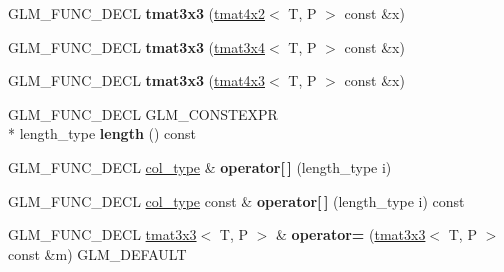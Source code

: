 \begin{DoxyCompactItemize}
\item 
\hypertarget{structglm_1_1tmat3x3_ae8cd7af88bb36bd318cf96f86bc27725}{G\-L\-M\-\_\-\-F\-U\-N\-C\-\_\-\-D\-E\-C\-L {\bfseries tmat3x3} (\hyperlink{structglm_1_1tmat4x2}{tmat4x2}$<$ T, P $>$ const \&x)}\label{structglm_1_1tmat3x3_ae8cd7af88bb36bd318cf96f86bc27725}

\item 
\hypertarget{structglm_1_1tmat3x3_a1498a92906adaa18834058fbea37a808}{G\-L\-M\-\_\-\-F\-U\-N\-C\-\_\-\-D\-E\-C\-L {\bfseries tmat3x3} (\hyperlink{structglm_1_1tmat3x4}{tmat3x4}$<$ T, P $>$ const \&x)}\label{structglm_1_1tmat3x3_a1498a92906adaa18834058fbea37a808}

\item 
\hypertarget{structglm_1_1tmat3x3_aca274ab9905b48dac255a6ae295dc193}{G\-L\-M\-\_\-\-F\-U\-N\-C\-\_\-\-D\-E\-C\-L {\bfseries tmat3x3} (\hyperlink{structglm_1_1tmat4x3}{tmat4x3}$<$ T, P $>$ const \&x)}\label{structglm_1_1tmat3x3_aca274ab9905b48dac255a6ae295dc193}

\item 
\hypertarget{structglm_1_1tmat3x3_afa107e9f2a195193a8d3843465956cdd}{G\-L\-M\-\_\-\-F\-U\-N\-C\-\_\-\-D\-E\-C\-L G\-L\-M\-\_\-\-C\-O\-N\-S\-T\-E\-X\-P\-R \\*
length\-\_\-type {\bfseries length} () const }\label{structglm_1_1tmat3x3_afa107e9f2a195193a8d3843465956cdd}

\item 
\hypertarget{structglm_1_1tmat3x3_a168abb413d19f4ff78005b4a4015c9e1}{G\-L\-M\-\_\-\-F\-U\-N\-C\-\_\-\-D\-E\-C\-L \hyperlink{structglm_1_1tvec3}{col\-\_\-type} \& {\bfseries operator\mbox{[}$\,$\mbox{]}} (length\-\_\-type i)}\label{structglm_1_1tmat3x3_a168abb413d19f4ff78005b4a4015c9e1}

\item 
\hypertarget{structglm_1_1tmat3x3_a7098a8e6c89fb4bce4a95e15b477a93e}{G\-L\-M\-\_\-\-F\-U\-N\-C\-\_\-\-D\-E\-C\-L \hyperlink{structglm_1_1tvec3}{col\-\_\-type} const \& {\bfseries operator\mbox{[}$\,$\mbox{]}} (length\-\_\-type i) const }\label{structglm_1_1tmat3x3_a7098a8e6c89fb4bce4a95e15b477a93e}

\item 
\hypertarget{structglm_1_1tmat3x3_a6a587ae3bc7c9ad30a5d05a789a809db}{G\-L\-M\-\_\-\-F\-U\-N\-C\-\_\-\-D\-E\-C\-L \hyperlink{structglm_1_1tmat3x3}{tmat3x3}$<$ T, P $>$ \& {\bfseries operator=} (\hyperlink{structglm_1_1tmat3x3}{tmat3x3}$<$ T, P $>$ const \&m) G\-L\-M\-\_\-\-D\-E\-F\-A\-U\-L\-T}\label{structglm_1_1tmat3x3_a6a587ae3bc7c9ad30a5d05a789a809db}


\end{DoxyCompactItemize}
